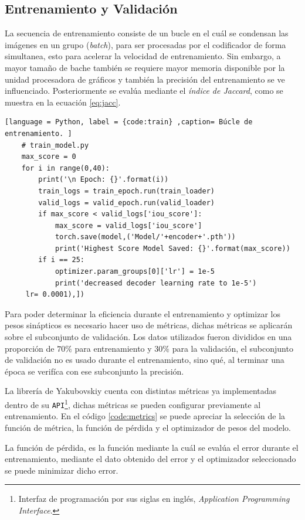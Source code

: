 \subsection{Entrenamiento y Validación}
La secuencia de entrenamiento consiste de un bucle en el cuál se condensan las imágenes en un grupo (\emph{batch}), para ser procesadas por el codificador de forma simultanea, esto para acelerar la velocidad de entrenamiento. Sin embargo, a mayor tamaño de bache también se requiere mayor memoria disponible por la unidad procesadora de gráficos y también la precisión del entrenamiento se ve influenciado. Posteriormente se evalúa mediante el \emph{índice de Jaccard}, como se muestra en la ecuación \ref{eq:jacc}.

\begin{lstlisting}[language = Python, label = {code:train} ,caption= Búcle de entrenamiento. ]
    # train_model.py
    max_score = 0 
    for i in range(0,40):
        print('\n Epoch: {}'.format(i))
        train_logs = train_epoch.run(train_loader)
        valid_logs = valid_epoch.run(valid_loader)
        if max_score < valid_logs['iou_score']:
            max_score = valid_logs['iou_score']
            torch.save(model,('Model/'+encoder+'.pth'))
            print('Highest Score Model Saved: {}'.format(max_score))
        if i == 25:
            optimizer.param_groups[0]['lr'] = 1e-5
            print('decreased decoder learning rate to 1e-5')
     lr= 0.0001),])
\end{lstlisting}

Para poder determinar la eficiencia durante el entrenamiento y optimizar los pesos sinápticos es necesario hacer uso de métricas, dichas métricas se aplicarán sobre el subconjunto de validación. Los datos utilizados fueron divididos en una proporción de $70\%$ para entrenamiento y $30\%$ para la validación, el subconjunto de validación no es usado durante el entrenamiento, sino qué, al terminar una época se verifíca con ese subconjunto la precisión.

La librería de Yakubovskiy \citep{Yakubovskiy:2019} cuenta con distintas métricas ya implementadas dentro de su \texttt{API}\footnote{Interfaz de programación por sus siglas en inglés, \emph{Application Programming Interface}.}, dichas métricas se pueden configurar previamente al entrenamiento. En el código \ref{code:metrics} se puede apreciar la selección de la función de métrica, la función de pérdida y el optimizador de pesos del modelo.

La función de pérdida, es la función mediante la cuál se evalúa el error durante el entrenamiento, mediante el dato obtenido del error y el optimizador seleccionado se puede minimizar dicho error.

